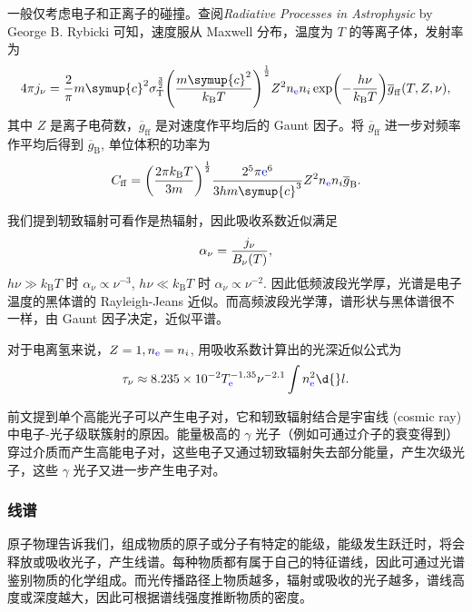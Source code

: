 \documentclass[../天体物理基础.tex]{subfiles}
\begin{document}
一般仅考虑电子和正离子的碰撞。查阅\textit{Radiative Processes in Astrophysic} by George B. Rybicki 可知，速度服从 Maxwell 分布，温度为 $T$ 的等离子体，发射率为
\begin{equation}
4\pi j_{\nu}=\frac{2}{\pi}m\symup{c}^{2}\sigma_{\mathrm{T}}^{\frac{3}{2}}\mleft(\frac{m\symup{c}^{2}}{k_{\mathrm{B}}T}\mright)^{\frac{1}{2}}Z^{2}n_{{\color{blue}{\ce{e}}}}n_{i}\exp\mleft(-\frac{h\nu}{k_{\mathrm{B}}T}\mright)\overline{g}_{\mathrm{ff}}\mleft(T, Z,\nu\mright),
\end{equation}
其中 $Z$ 是离子电荷数，$\overline{g}_{\mathrm{ff}}$ 是对速度作平均后的 Gaunt 因子。将 $\overline{g}_{\mathrm{ff}}$ 进一步对频率作平均后得到 $\overline{g}_{\mathrm{B}}$, 单位体积的功率为
\begin{equation}
C_{\mathrm{ff}}=\mleft(\frac{2\pi{}k_{\mathrm{B}}T}{3m}\mright)^{\frac{1}{2}}\frac{2^{5}\pi{\color{blue}{\ce{e}}}^{6}}{3hm\symup{c}^{3}}Z^{2}n_{{\color{blue}{\ce{e}}}}n_{i}\overline{g}_{\mathrm{B}}.
\end{equation}

我们提到轫致辐射可看作是热辐射，因此吸收系数近似满足
\begin{equation}
\alpha_{\nu}=\frac{j_{\nu}}{B_{\nu}\mleft(T\mright)},
\end{equation}
$h\nu\gg{}k_{\mathrm{B}}T$ 时 $\alpha_{\nu}\propto\nu^{-3}$, $h\nu\ll{}k_{\mathrm{B}}T$ 时 $\alpha_{\nu}\propto\nu^{-2}$. 因此低频波段光学厚，光谱是电子温度的黑体谱的 Rayleigh-Jeans 近似。而高频波段光学薄，谱形状与黑体谱很不一样，由 Gaunt 因子决定，近似平谱。

对于电离氢来说，$Z=1, n_{{\color{blue}{\ce{e}}}}=n_{i}$, 用吸收系数计算出的光深近似公式为
\begin{equation}
\tau_{\nu}\approx8.235\times10^{-2}T_{{\color{blue}{\ce{e}}}}^{-1.35}\nu^{-2.1}\int n_{{\color{blue}{\ce{e}}}}^{2}\d{}l.
\end{equation}

前文提到单个高能光子可以产生电子对，它和轫致辐射结合是宇宙线 (cosmic ray) 中电⼦{}-{}光⼦级联簇射的原因。能量极⾼的 $\gamma$ 光⼦（例如可通过介⼦的衰变得到）穿过介质⽽产生⾼能电⼦对，这些电子又通过轫致辐射失去部分能量，产⽣次级光⼦，这些 $\gamma$ 光⼦又进一步产⽣电⼦对。

\subsubsection{线谱}
原子物理告诉我们，组成物质的原子或分子有特定的能级，能级发生跃迁时，将会释放或吸收光子，产生线谱。每种物质都有属于自己的特征谱线，因此可通过光谱鉴别物质的化学组成。而光传播路径上物质越多，辐射或吸收的光子越多，谱线高度或深度越大，因此可根据谱线强度推断物质的密度。
\end{document}
